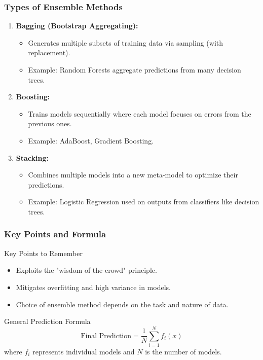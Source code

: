 \documentclass{beamer}
\begin{document}
\begin{frame}[fragile]
    \frametitle{Types of Ensemble Methods}
    \begin{enumerate}
        \item \textbf{Bagging (Bootstrap Aggregating):}
        \begin{itemize}
            \item Generates multiple subsets of training data via sampling (with replacement).
            \item Example: Random Forests aggregate predictions from many decision trees.
        \end{itemize}

        \item \textbf{Boosting:}
        \begin{itemize}
            \item Trains models sequentially where each model focuses on errors from the previous ones.
            \item Example: AdaBoost, Gradient Boosting.
        \end{itemize}

        \item \textbf{Stacking:}
        \begin{itemize}
            \item Combines multiple models into a new meta-model to optimize their predictions.
            \item Example: Logistic Regression used on outputs from classifiers like decision trees.
        \end{itemize}
    \end{enumerate}
\end{frame}

\begin{frame}[fragile]
    \frametitle{Key Points and Formula}
    \begin{block}{Key Points to Remember}
        \begin{itemize}
            \item Exploits the "wisdom of the crowd" principle.
            \item Mitigates overfitting and high variance in models.
            \item Choice of ensemble method depends on the task and nature of data.
        \end{itemize}
    \end{block}
    
    \begin{block}{General Prediction Formula}
        \begin{equation}
            \text{Final Prediction} = \frac{1}{N} \sum_{i=1}^{N} f_i(x)
        \end{equation}
        where \( f_i \) represents individual models and \( N \) is the number of models.
    \end{block}
\end{frame}
\end{document}
